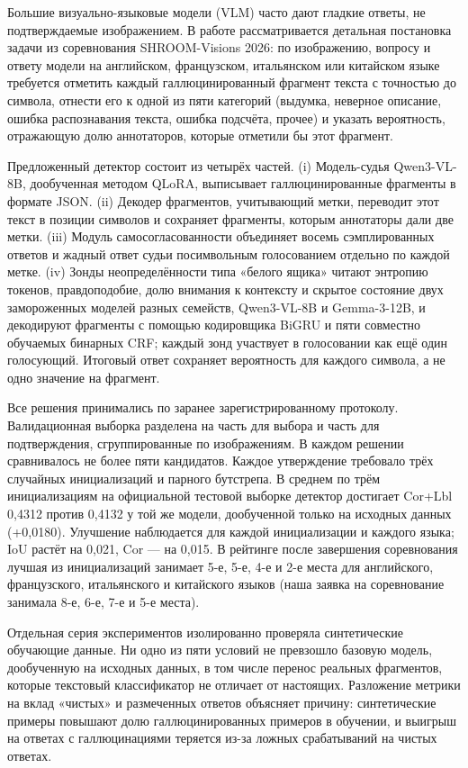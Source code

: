 Большие визуально-языковые модели (VLM) часто дают гладкие ответы, не подтверждаемые изображением. В работе рассматривается детальная постановка задачи из соревнования SHROOM-Visions 2026: по изображению, вопросу и ответу модели на английском, французском, итальянском или китайском языке требуется отметить каждый галлюцинированный фрагмент текста с точностью до символа, отнести его к одной из пяти категорий (выдумка, неверное описание, ошибка распознавания текста, ошибка подсчёта, прочее) и указать вероятность, отражающую долю аннотаторов, которые отметили бы этот фрагмент.

Предложенный детектор состоит из четырёх частей. (i) Модель-судья Qwen3-VL-8B, дообученная методом QLoRA, выписывает галлюцинированные фрагменты в формате JSON. (ii) Декодер фрагментов, учитывающий метки, переводит этот текст в позиции символов и сохраняет фрагменты, которым аннотаторы дали две метки. (iii) Модуль самосогласованности объединяет восемь сэмплированных ответов и жадный ответ судьи посимвольным голосованием отдельно по каждой метке. (iv) Зонды неопределённости типа «белого ящика» читают энтропию токенов, правдоподобие, долю внимания к контексту и скрытое состояние двух замороженных моделей разных семейств, Qwen3-VL-8B и Gemma-3-12B, и декодируют фрагменты с помощью кодировщика BiGRU и пяти совместно обучаемых бинарных CRF; каждый зонд участвует в голосовании как ещё один голосующий. Итоговый ответ сохраняет вероятность для каждого символа, а не одно значение на фрагмент.

Все решения принимались по заранее зарегистрированному протоколу. Валидационная выборка разделена на часть для выбора и часть для подтверждения, сгруппированные по изображениям. В каждом решении сравнивалось не более пяти кандидатов. Каждое утверждение требовало трёх случайных инициализаций и парного бутстрепа. В среднем по трём инициализациям на официальной тестовой выборке детектор достигает Cor+Lbl 0,4312 против 0,4132 у той же модели, дообученной только на исходных данных (+0,0180). Улучшение наблюдается для каждой инициализации и каждого языка; IoU растёт на 0,021, Cor — на 0,015. В рейтинге после завершения соревнования лучшая из инициализаций занимает 5-е, 5-е, 4-е и 2-е места для английского, французского, итальянского и китайского языков (наша заявка на соревнование занимала 8-е, 6-е, 7-е и 5-е места).

Отдельная серия экспериментов изолированно проверяла синтетические обучающие данные. Ни одно из пяти условий не превзошло базовую модель, дообученную на исходных данных, в том числе перенос реальных фрагментов, которые текстовый классификатор не отличает от настоящих. Разложение метрики на вклад «чистых» и размеченных ответов объясняет причину: синтетические примеры повышают долю галлюцинированных примеров в обучении, и выигрыш на ответах с галлюцинациями теряется из-за ложных срабатываний на чистых ответах.
